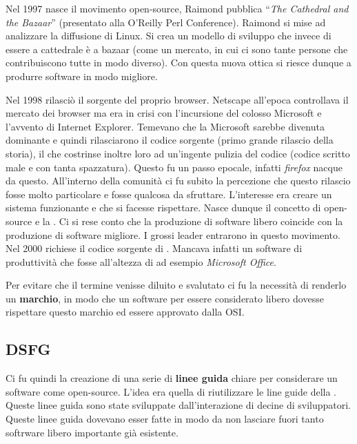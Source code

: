 Nel 1997 nasce il movimento open-source, Raimond pubblica ``\textit{The Cathedral and the Bazaar}'' (presentato alla O'Reilly Perl Conference). Raimond si mise ad analizzare la diffusione di Linux. Si crea un modello di sviluppo che invece di essere a cattedrale è a bazaar (come un mercato, in cui ci sono tante persone che contribuiscono tutte in modo diverso). Con questa nuova ottica si riesce dunque a produrre software in modo migliore.

Nel 1998  rilasciò il sorgente del proprio browser. Netscape all'epoca controllava il mercato dei browser ma era in crisi con l'incursione del colosso Microsoft e l'avvento di Internet Explorer. Temevano che la Microsoft sarebbe divenuta dominante e quindi rilasciarono il codice sorgente (primo grande rilascio della storia), il che costrinse inoltre loro ad un'ingente pulizia del codice (codice scritto male e con tanta spazzatura). Questo fu un passo epocale, infatti \textit{firefox} nacque da questo. All'interno della comunità ci fu subito la percezione che questo rilascio fosse molto particolare e fosse qualcosa da sfruttare. L'interesse era creare un sistema funzionante e che si facesse rispettare. Nasce dunque il concetto di open-source e la . Ci si rese conto che la produzione di software libero coincide con la produzione di software migliore. I grossi leader entrarono in questo movimento. Nel 2000  richiese il codice sorgente di . Mancava infatti un software di produttività che fosse all'altezza di ad esempio \textit{Microsoft Office}.

Per evitare che il termine venisse diluito e svalutato ci fu la necessità di renderlo un \textbf{marchio}, in modo che un software per essere considerato libero dovesse rispettare questo marchio ed essere approvato dalla OSI. 

\subsection{DSFG}

Ci fu quindi la creazione di una serie di \textbf{linee guida} chiare per considerare un software come open-source. L'idea era quella di riutilizzare le line guide della . Queste linee guida sono state sviluppate dall'interazione di decine di sviluppatori. Queste linee guida dovevano esser fatte in modo da non lasciare fuori tanto softrware libero importante già esistente.

